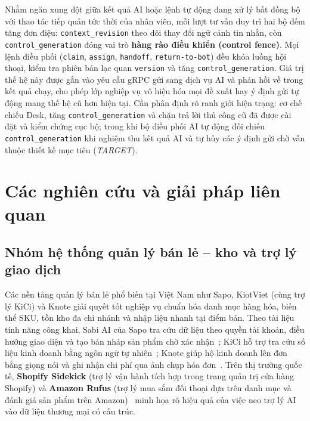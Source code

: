 Nhằm ngăn xung đột giữa kết quả AI hoặc lệnh tự động đang xử lý bất đồng bộ với thao tác tiếp quản tức thời của nhân viên, mỗi lượt tư vấn duy trì hai bộ đếm tăng đơn điệu:
\texttt{context\_\hspace{0pt}revision} theo dõi thay đổi ngữ cảnh tin nhắn, còn \texttt{control\_\hspace{0pt}generation} đóng vai trò \textbf{hàng rào điều khiển (control fence)}. Mọi lệnh điều phối (\texttt{claim},
\texttt{assign}, \texttt{handoff}, \texttt{return-\hspace{0pt}to-\hspace{0pt}bot}) đều khóa luồng hội thoại, kiểm tra phiên bản lạc quan \texttt{version} và tăng \texttt{control\_\hspace{0pt}generation}. Giá trị thế hệ này được gắn
vào yêu cầu gRPC gửi sang dịch vụ AI và phản hồi về trong kết quả chạy, cho phép lớp nghiệp vụ vô hiệu hóa mọi đề xuất hay ý định gửi tự động mang thế hệ cũ hơn hiện tại. Cần phân định rõ ranh
giới hiện trạng: cơ chế chiếu Desk, tăng \texttt{control\_\hspace{0pt}generation} và chặn trả lời thủ công cũ đã được cài đặt và kiểm chứng cục bộ; trong khi bộ điều phối AI tự động đối chiếu
\texttt{control\_\hspace{0pt}generation} khi nghiệm thu kết quả AI và tự hủy các ý định gửi chờ vẫn thuộc thiết kế mục tiêu (\emph{TARGET}).

\section{Các nghiên cứu và giải pháp liên quan}

\subsection{Nhóm hệ thống quản lý bán lẻ -- kho và trợ lý giao dịch}
Các nền tảng quản lý bán lẻ phổ biến tại Việt Nam như Sapo, KiotViet (cùng trợ lý KiCi) và Knote giải quyết tốt nghiệp vụ chuẩn hóa danh mục hàng hóa, biến thể SKU, tồn kho đa chi nhánh và nhập
liệu nhanh tại điểm bán. Theo tài liệu tính năng công khai, Sabi AI của Sapo tra cứu dữ liệu theo quyền tài khoản, điều hướng giao diện và tạo bản nháp sản phẩm chờ xác nhận~\cite{sapo-sabi}; KiCi hỗ trợ
tra cứu số liệu kinh doanh bằng ngôn ngữ tự nhiên~\cite{kiotviet-kici}; Knote giúp hộ kinh doanh lên đơn bằng giọng nói và ghi nhận chi phí qua ảnh chụp hóa đơn~\cite{knote-vneconomy,knote-appstore}. Trên thị trường quốc tế, \textbf{Shopify Sidekick} (trợ lý vận
hành tích hợp trong trang quản trị cửa hàng Shopify) và \textbf{Amazon Rufus} (trợ lý mua sắm đối thoại dựa trên danh mục và đánh giá sản phẩm trên Amazon)~\cite{shopify-sidekick,amazon-rufus} minh họa rõ hiệu quả của việc neo trợ
lý AI vào dữ liệu thương mại có cấu trúc.

